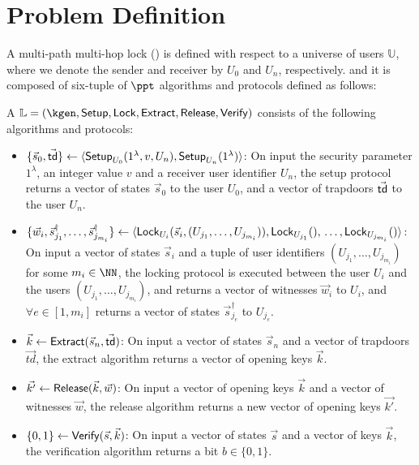 \section{Problem Definition}



A multi-path multi-hop lock (\sysname) is defined with respect to a universe of users $\mathbb{U}$, where we 
denote the sender and receiver by $U_0$ and $U_n$, respectively. and it is composed of six-tuple of $\ppt$ 
algorithms and protocols defined as follows:

\begin{definition}
A \sysname $\mathbb{L} = (\kgen, \Setup, \Lock, \Extract, \Release,\\ \Verify)$ consists of the 
following algorithms and protocols:

\begin{itemize}[leftmargin=15pt] %
	\item $\{\vec{s}_0, \vec{\mathsf{td}}\} \gets \langle \mathsf{Setup}_{U_0}(1^\lambda, v, U_n),\mathsf{Setup}_{U_n}(1^\lambda) 
	\rangle$: On input the security parameter $1^\lambda$, an integer value $v$ and a receiver user identifier 
	$U_n$, the setup protocol returns a vector of states $\vec{s}_0$ to the user $U_0$, and a vector 
	of trapdoors $\vec{\mathsf{td}}$ to the user $U_n$.
	
	\item $\{\vec{w}_i,\vec{s}_{j_1}^\dag,\ldots,\vec{s}_{j_{m_i}}^\dag\} \gets \langle 
	\mathsf{Lock}_{U_i}(\vec{s}_i, (U_{j_1},\ldots,U_{j_{m_i}})), \mathsf{Lock}_{U_{j_1}}(),\\ \ldots, \mathsf{Lock}_{U_{j_{m_i}}}() 
	\rangle$: On input a vector of states $\vec{s}_i$ and a tuple of user identifiers $(U_{j_1},\ldots,
	U_{j_{m_i}})$ for some $m_i \in \NN$, the locking protocol is executed between the user $U_i$ and the users 
	$(U_{j_1},\ldots,U_{j_{m_i}})$, and returns a vector of witnesses $\vec{w}_i$ to $U_i$, and $\forall e 
	\in [1,m_i]$ returns a vector of states $\vec{s}_{j_e}^\dag$ to $U_{j_e}$.
	
	\item $\vec{k} \gets \mathsf{Extract}(\vec{s}_n,\vec{\mathsf{td}})$: On input a vector of states $\vec{s}_n$ and a 
	vector of trapdoors $\vec{td}$, the extract algorithm returns a vector of opening keys $\vec{k}$.
	
	\item $\vec{k'} \gets \mathsf{Release}(\vec{k},\vec{w})$: On input a vector of opening keys $\vec{k}$ and a 
	vector of witnesses $\vec{w}$, the release algorithm returns a new vector of opening keys $\vec{k'}$.
	
	\item $\{0,1\} \gets \mathsf{Verify}(\vec{s}, \vec{k})$: On input a vector of states $\vec{s}$ and a vector 
	of keys $\vec{k}$, the verification algorithm returns a bit $b \in \{0,1\}$.
\end{itemize}
\end{definition}

